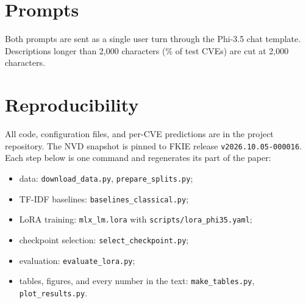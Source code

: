 \section{Prompts}\label{app:prompts}
Both prompts are sent as a single user turn through the Phi-3.5 chat template.
Descriptions longer than 2,000 characters (\nTestClipped\% of test CVEs) are cut at 2,000 characters.


\section{Reproducibility}\label{app:repro}
All code, configuration files, and per-CVE predictions are in the project repository.
The NVD snapshot is pinned to FKIE release \texttt{v2026.10.05-000016}.
Each step below is one command and regenerates its part of the paper:
\begin{itemize}\itemsep0pt
  \item data: \texttt{download\_data.py}, \texttt{prepare\_splits.py};
  \item TF-IDF baselines: \texttt{baselines\_classical.py};
  \item LoRA training: \texttt{mlx\_lm.lora} with \texttt{scripts/lora\_phi35.yaml};
  \item checkpoint selection: \texttt{select\_checkpoint.py};
  \item evaluation: \texttt{evaluate\_lora.py};
  \item tables, figures, and every number in the text: \texttt{make\_tables.py}, \texttt{plot\_results.py}.
\end{itemize}
